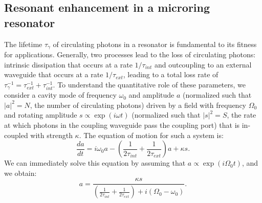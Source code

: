 \subsection{Resonant enhancement in a microring resonator}
 The lifetime $\tau_\gamma$ of circulating photons in a resonator is fundamental to its fitness for applications. Generally, two processes lead to the loss of circulating photons: intrinsic dissipation that occurs at a rate $1/\tau_{int}$ and outcoupling to an external waveguide that occurs at a rate $1/\tau_{ext}$, leading to a total loss rate of $\tau_\gamma^{-1}=\tau_{ext}^{-1}+\tau_{int}^{-1}$. To understand the quantitative role of these parameters, we consider a cavity mode of frequency $\omega_0$ and amplitude $a$ (normalized such that $|a|^2=N$, the number of circulating photons) driven by a field with frequency $\Omega_0$ and rotating amplitude $s\propto\exp(i\omega t)$ (normalized such that $|s|^2=S$, the rate at which photons in the coupling waveguide pass the coupling port) that is in-coupled with strength $\kappa$. The equation of motion for such a system is\cite{Haus1984}:
 \begin{equation}
 \frac{d a}{d t}=i\omega_0 a-\left(\frac{1}{2\tau_{int}}+\frac{1}{2\tau_{ext}}\right)a+\kappa s. \label{eq:coupledmotion}
 \end{equation}
 We can immediately solve this equation by assuming that $a\propto\exp(i\Omega_0 t)$, and we obtain:
 \begin{equation}
 a=\frac{\kappa s}{\left(\frac{1}{2\tau_{int}}+\frac{1}{2\tau_{ext}}\right)+i(\Omega_0-\omega_0)}. \label{eq:coupledsoln}
 \end{equation}
 
